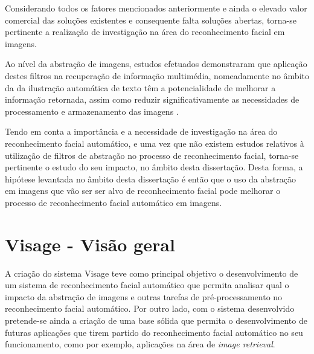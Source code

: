 Considerando todos os fatores mencionados anteriormente e ainda o elevado valor comercial das soluções existentes e consequente falta soluções abertas, torna-se pertinente a realização de investigação na área do reconhecimento facial em imagens. 

Ao nível da abstração de imagens, estudos efetuados demonstraram que aplicação destes filtros na recuperação de informação multimédia, nomeadamente no âmbito da da ilustração automática de texto têm a potencialidade de melhorar a informação retornada, assim como reduzir significativamente as necessidades de processamento e armazenamento das imagens \cite{Coelho:2012:IAC:2260641.2260676}. 

Tendo em conta a importância e a necessidade de investigação na área do reconhecimento facial automático, e uma vez que não existem estudos relativos à utilização de filtros de abstração no processo de reconhecimento facial, torna-se pertinente o estudo do seu impacto, no âmbito desta dissertação. Desta forma, a hipótese levantada no âmbito desta dissertação é então que o uso da abstração em imagens que vão ser ser alvo de reconhecimento facial pode melhorar o processo de reconhecimento facial automático em imagens.

\section{Visage - Visão geral} \label{sec:visage}
A criação do sistema Visage teve como principal objetivo o desenvolvimento de um sistema de reconhecimento facial automático que permita analisar qual o impacto da abstração de imagens e outras tarefas de pré-processamento no reconhecimento facial automático. Por outro lado, com o sistema desenvolvido pretende-se ainda a criação de uma base sólida que permita o desenvolvimento de futuras aplicações que tirem partido do reconhecimento facial automático no seu funcionamento, como por exemplo, aplicações na área de \textit{image retrieval}.


